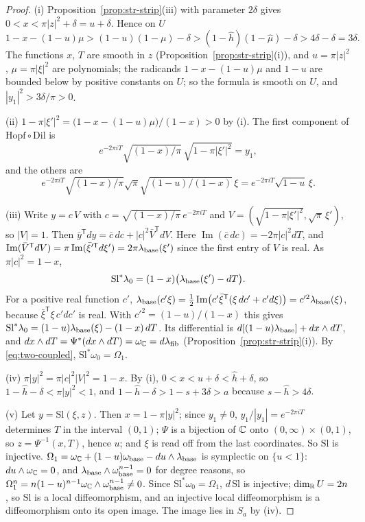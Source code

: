 \begin{proof}
(i) Proposition~\ref{prop:str-strip}(iii) with parameter $2\delta$ gives $0<x<\pi|z|^2+\delta=u+\delta$. Hence on $U$
\[
 1-x-(1-u)\mu>(1-u)(1-\mu)-\delta>(1-\hat h)(1-\hat\mu)-\delta>4\delta-\delta=3\delta .
\]
The functions $x$, $T$ are smooth in $z$ (Proposition~\ref{prop:str-strip}(i)), and $u=\pi|z|^2$, $\mu=\pi|\xi|^2$ are
polynomials; the radicands $1-x-(1-u)\mu$ and $1-u$ are bounded below by positive constants on $U$; so the formula is
smooth on $U$, and $|y_1|^2>3\delta/\pi>0$.

(ii) $1-\pi|\xi'|^2=\bigl(1-x-(1-u)\mu\bigr)/(1-x)>0$ by (i). The first component of $\mathrm{Hopf}\circ\mathrm{Dil}$ is
\[
 e^{-2\pi iT}\sqrt{(1-x)/\pi}\,\sqrt{1-\pi|\xi'|^2}=y_1,
\]
and the others are
\[
 e^{-2\pi iT}\sqrt{(1-x)/\pi}\sqrt\pi\sqrt{(1-u)/(1-x)}\,\xi=e^{-2\pi iT}\sqrt{1-u}\,\xi.
\]

(iii) Write $y=c\,V$ with $c=\sqrt{(1-x)/\pi}\,e^{-2\pi iT}$ and $V=(\sqrt{1-\pi|\xi'|^2},\sqrt\pi\,\xi')$, so $|V|=1$. Then
$\bar y^{\mathsf T}dy=\bar c\,dc+|c|^2\bar V^{\mathsf T}dV$. Here $\operatorname{Im}(\bar c\,dc)=-2\pi|c|^2dT$, and
$\operatorname{Im}(\bar V^{\mathsf T}dV)=\pi\operatorname{Im}(\bar\xi'^{\mathsf T}d\xi')=2\pi\lambda_{\rm base}(\xi')$ since the first entry of $V$ is
real. As $\pi|c|^2=1-x$,
\[
 \mathrm{Sl}^*\lambda_0=(1-x)\bigl(\lambda_{\rm base}(\xi')-dT\bigr).
\]
For a positive real function $c'$, $\lambda_{\rm base}(c'\xi)=\frac12\operatorname{Im}\bigl(c'\bar\xi^{\mathsf T}(\xi\,dc'+c'd\xi)\bigr)=c'^2\lambda_{\rm base}(\xi)$,
because $\bar\xi^{\mathsf T}\xi\,c'dc'$ is real. With $c'^2=(1-u)/(1-x)$ this gives
$\mathrm{Sl}^*\lambda_0=(1-u)\lambda_{\rm base}(\xi)-(1-x)\,dT$. Its differential is $d[(1-u)\lambda_{\rm base}]+dx\wedge dT$, and
$dx\wedge dT=\Psi^*(dx\wedge dT)=\omega_{\mathbb{C}}=d\lambda_{\rm fib}$ (Proposition~\ref{prop:str-strip}(i)). By \eqref{eq:two-coupled},
$\mathrm{Sl}^*\omega_0=\Omega_1$.

(iv) $\pi|y|^2=\pi|c|^2|V|^2=1-x$. By (i), $0<x<u+\delta<\hat h+\delta$, so $1-\hat h-\delta<\pi|y|^2<1$, and
$1-\hat h-\delta>1-s+3\delta>a$ because $s-\hat h>4\delta$.

(v) Let $y=\mathrm{Sl}(\xi,z)$. Then $x=1-\pi|y|^2$; since $y_1\ne0$, $y_1/|y_1|=e^{-2\pi iT}$ determines $T$ in the interval $(0,1)$;
$\Psi$ is a bijection of $\mathbb{C}$ onto $(0,\infty)\times(0,1)$, so $z=\Psi^{-1}(x,T)$, hence $u$; and $\xi$ is read off from the last
coordinates. So $\mathrm{Sl}$ is injective. $\Omega_1=\omega_{\mathbb{C}}+(1-u)\omega_{\rm base}-du\wedge\lambda_{\rm base}$ is symplectic on
$\{u<1\}$: $du\wedge\omega_{\mathbb{C}}=0$, and $\lambda_{\rm base}\wedge\omega_{\rm base}^{n-1}=0$ for degree reasons, so
$\Omega_1^n=n(1-u)^{n-1}\omega_{\mathbb{C}}\wedge\omega_{\rm base}^{n-1}\ne0$. Since $\mathrm{Sl}^*\omega_0=\Omega_1$, $d\,\mathrm{Sl}$ is injective; $\dim_{\mathbb{R}} U=2n$, so $\mathrm{Sl}$ is a local diffeomorphism, and an
injective local diffeomorphism is a diffeomorphism onto its open image. The image lies in $S_a$ by (iv).


\end{proof}
